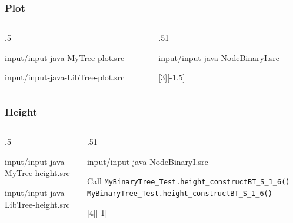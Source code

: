 \documentclass[10pt]{beamer}
\begin{document}




\begin{frame}[t]\frametitle{Plot}
	\vspace{-0.3cm}
	\begin{columns}[T] %
	\begin{column}{.5\linewidth} %
		{\tiny 
			
				{input/input-java-MyTree-plot.src}
		} %
		\vspace{-0.1cm}
		{\tiny 
			
				{input/input-java-LibTree-plot.src}
		} %
	\end{column} %
	\begin{column}{.51\linewidth} %
		{\tiny 
			
				{input/input-java-NodeBinaryI.src}
		} %
		{\scriptsize
		\begin{example}
			
		\end{example}
		} %
		
		[3][-1.5]
	\end{column} %
	\end{columns} %
\end{frame}




\begin{frame}[t]\frametitle{Height}
	\vspace{-0.3cm}
	\begin{columns}[T] %
	\begin{column}{.5\linewidth} %
		{\tiny 
			
				{input/input-java-MyTree-height.src}
		} %
		\vspace{-0.1cm}
		{\tiny 
			
				{input/input-java-LibTree-height.src}
		} %
	\end{column} %
	\begin{column}{.51\linewidth} %
		{\tiny 
			
				{input/input-java-NodeBinaryI.src}
		} %
		{\scriptsize
		\begin{example}
			
			
			Call 
			{\tiny \texttt{MyBinaryTree\_Test.height\_constructBT\_S\_1\_6()}}
			{\scriptsize \texttt{MyBinaryTree\_Test.height\_constructBT\_S\_1\_6()}}
		\end{example}
		} %
		
		[4][-1]
	\end{column} %
	\end{columns} %
\end{frame}
\end{document}
